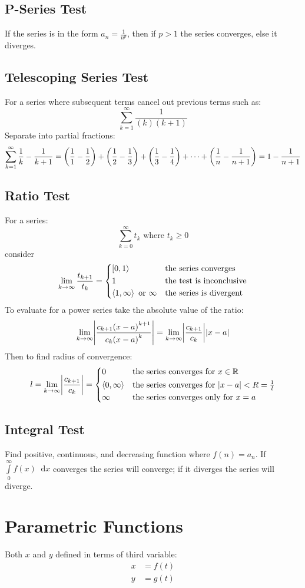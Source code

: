 \documentclass[12pt]{article}
\DeclarePairedDelimiter\abs{\lvert}{\rvert}
\DeclarePairedDelimiter\paren{(}{)}
\newcommand*{\D}[1]{\mathop{}\!\mathrm{d}#1}
\newcommand*{\isum}[1]{\sum\limits_{#1}^\infty}
\begin{document}
\subsection*{P-Series Test}
If the series is in the form \(a_n = \frac{1}{n^p}\), then if \(p > 1\) the
series converges, else it diverges.
\subsection*{Telescoping Series Test}
For a series where subsequent terms cancel out previous terms such as:
\[
  \isum{k=1} \frac{1}{(k)(k+1)}
\]
Separate into partial fractions:
\[
  \isum{k=1} \frac{1}{k}-\frac{1}{k+1} = \paren*{\frac{1}{1} - \frac{1}{2}} +
  \paren*{\frac{1}{2} - \frac{1}{3}} + \paren*{\frac{1}{3} - \frac{1}{4}}
  + \cdots + \paren*{\frac{1}{n} - \frac{1}{n+1}}
  = 1 - \frac{1}{n+1}
\]
\subsection*{Ratio Test}
For a series:
\[
  \isum{k=0} t_k \text{ where } t_k \ge 0
\]
consider
\[
  \lim_{k \to \infty} \frac{t_{k+1}}{t_k} = \begin{dcases*}
    \left[0,1\right> & the series converges\\
    1 & the test is inconclusive\\
    \left<1,\infty\right> \text{ or } \infty  & the series is divergent
  \end{dcases*}
\]
To evaluate for a power series take the absolute value of the ratio:
\[
  \lim_{k \to \infty} \abs*{\frac{c_{k+1}{(x-a)}^{k+1}}{c_k{(x-a)}^k}}
  = \lim_{k \to \infty} \abs*{\frac{c_{k+1}}{c_k}}\abs*{x-a}
\]
Then to find radius of convergence:
\[
  l = \lim_{k \to \infty} \abs*{\frac{c_{k+1}}{c_k}} = \begin{dcases*}
    0 & the series converges for \(x \in \mathbb{R}\)\\
    \left<0,\infty\right> & the series converges for
      \(\abs*{x-a} < R = \tfrac{1}{l}\)\\
    \infty & the series converges only for \(x=a\)
  \end{dcases*}
\]
\subsection*{Integral Test}
Find positive, continuous, and decreasing function where \(f(n) = a_n\). If
\(\int\limits_0^\infty f(x) \D{x}\) converges the series will converge; if it
diverges the series will diverge.
\section*{Parametric Functions}
Both \(x\) and \(y\) defined in terms of third variable:
\begin{align*}
  x &= f(t)\\
  y &= g(t)
\end{align*}
\end{document}
